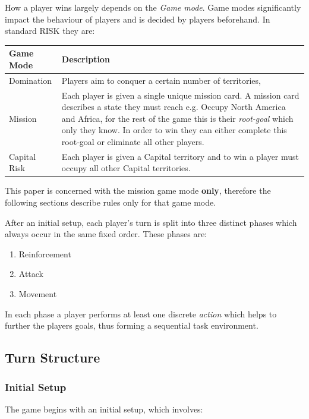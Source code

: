 \documentclass[parskip]{cs4rep}
\begin{document}
How a player wins largely depends on the \textit{Game mode}. Game modes significantly impact the behaviour of players and is decided by players beforehand. In standard RISK they are:
\newline

\begin{tabular}{|l|p{11cm}|}
\hline 
\textbf{Game Mode} & \textbf{Description} \\ 
\hline 
Domination & Players aim to conquer a certain number of territories, \\ 
\hline 
Mission & Each player is given a single unique mission card. A mission card describes a state they must reach e.g. Occupy North America and Africa, for the rest of the game this is their \textit{root-goal} which only they know. In order to win they can either complete this root-goal or eliminate all other players. \\ 
\hline 
Capital Risk & Each player is given a Capital territory and to win a player must occupy all other Capital territories. \\ 
\hline
\end{tabular} 

This paper is concerned with the mission game mode \textbf{only}, therefore the following sections describe rules only for that game mode.

After an initial setup, each player's turn is split into three distinct phases which always occur in the same fixed order. These phases are:

\begin{enumerate}
\item
Reinforcement
\item
Attack
\item
Movement
\end{enumerate}

In each phase a player performs at least one discrete \textit{action} which helps to further the players goals, thus forming a sequential task environment.

\subsection{Turn Structure}

\subsubsection{Initial Setup}

The game begins with an initial setup, which involves:
\end{document}
